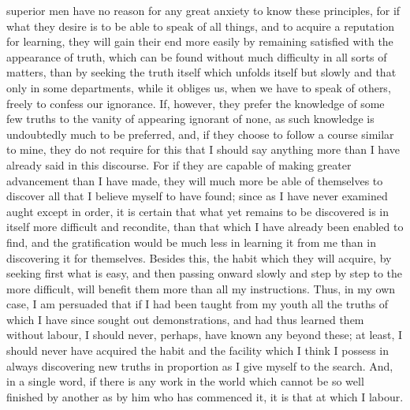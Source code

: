 \documentclass[12pt]{article}
\begin{document}
superior men have no reason for any great anxiety to know these principles, for if what they desire is to be able to speak of all things, and to acquire a reputation for learning, they will gain their end more easily by remaining satisfied with the appearance of truth, which can be found without much difficulty in all sorts of matters, than by seeking the truth itself which unfolds itself but slowly and that only in some departments, while it obliges us, when we have to speak of others, freely to confess our ignorance. If, however, they prefer the knowledge of some few truths to the vanity of appearing ignorant of none, as such knowledge is undoubtedly much to be preferred, and, if they choose to follow a course similar to mine, they do not require for this that I should say anything more than I have already said in this discourse. For if they are capable of making greater advancement than I have made, they will much more be able of themselves to discover all that I believe myself to have found; since as I have never examined aught except in order, it is certain that what yet remains to be discovered is in itself more difficult and recondite, than that which I have already been enabled to find, and the gratification would be much less in learning it from me than in discovering it for themselves. Besides this, the habit which they will acquire, by seeking first what is easy, and then passing onward slowly and step by step to the more difficult, will benefit them more than all my instructions. Thus, in my own case, I am persuaded that if I had been taught from my youth all the truths of which I have since sought out demonstrations, and had thus learned them without labour, I should never, perhaps, have known any beyond these; at least, I should never have acquired the habit and the facility which I think I possess in always discovering new truths in proportion as I give myself to the search. And, in a single word, if there is any work in the world which cannot be so well finished by another as by him who has commenced it, it is that at which I labour.
\end{document}
